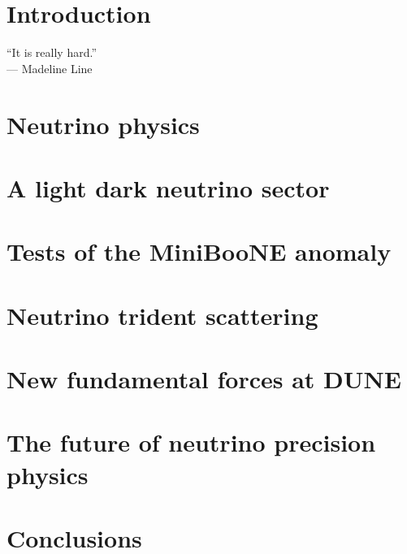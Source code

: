 \documentclass[openany,twoside,frontopenright,chaprunninghead]{ip3thesis}
\begin{document}
\chapter{Introduction}
\begin{flushright}
	``It is really hard.''
	\\--- Madeline Line
\end{flushright}


\chapter{Neutrino physics}


\chapter{A light dark neutrino sector}


\chapter{Tests of the MiniBooNE anomaly}


\chapter{Neutrino trident scattering}


\chapter{New fundamental forces at DUNE}


\chapter{The future of neutrino precision physics}
%

\chapter{Conclusions}

\end{document}
